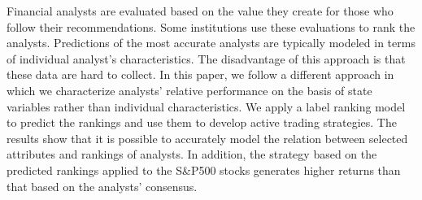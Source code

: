 Financial analysts are evaluated based on the value they create for those who follow their recommendations. Some institutions use these evaluations to rank the analysts. Predictions of the most accurate analysts are  typically modeled in terms of individual analyst's characteristics. The disadvantage of this approach is that these data are hard to collect. In this paper, we follow a different approach in which we characterize analysts' relative performance  on the basis of state variables rather than individual characteristics.  We apply a  label ranking model to predict the rankings and use them to develop active trading strategies. The results show that it is possible to accurately model the relation between selected attributes and rankings of analysts. In addition,  the strategy based on the predicted rankings  applied to the S\&P500 stocks  generates higher returns than that based on the analysts' consensus.
